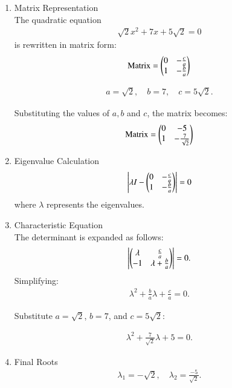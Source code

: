 \documentclass[journal]{IEEEtran}
\numberwithin{equation}{enumi}
\numberwithin{figure}{enumi}
\begin{document}
\begin{enumerate}
\begin{enumerate}
\item Matrix Representation \\
The quadratic equation 
\begin{align}
\sqrt{2}x^2 + 7x + 5\sqrt{2} = 0
\end{align}
is rewritten in matrix form:
\begin{align}
\text{Matrix} =
\begin{pmatrix}0 & -\frac{c}{a} \\
1 & -\frac{b}{a}
\end{pmatrix}
\end{align}

\begin{align}
a = \sqrt{2}, \quad b = 7, \quad c = 5\sqrt{2}.
\end{align}

Substituting the values of $a,b$ and $c$, the matrix becomes:
\begin{align}
\text{Matrix} =
\begin{pmatrix}0 & -5 \\
1 & -\frac{7}{\sqrt{2}}
\end{pmatrix}
\end{align}

\item Eigenvalue Calculation \\
\begin{align}
\left\vert\lambda I - 
\begin{pmatrix}0 & -\frac{c}{a} \\
1 & -\frac{b}{a}\end{pmatrix}\right\vert = 0
\end{align}
where $\lambda$ represents the eigenvalues.

\item Characteristic Equation \\
The determinant is expanded as follows:
\begin{align}
\left\vert\begin{pmatrix}\lambda & \frac{c}{a} \\
-1 & \lambda + \frac{b}{a}\end{pmatrix}\right\vert
= 0.
\end{align}
Simplifying:
\begin{align}
\lambda^2 + \frac{b}{a}\lambda + \frac{c}{a} = 0.
\end{align}

Substitute $a = \sqrt{2}$, $b = 7$, and $c = 5\sqrt{2}$:

\begin{align}
\lambda^2 + \frac{7}{\sqrt{2}}\lambda + 5 = 0.
\end{align}
\item Final Roots\\

\begin{align}
\lambda_1 = -\sqrt{2} , \quad \lambda_2 = \frac{-5}{\sqrt{2}}.
\end{align}


\end{enumerate}
\end{enumerate}
\end{document}
